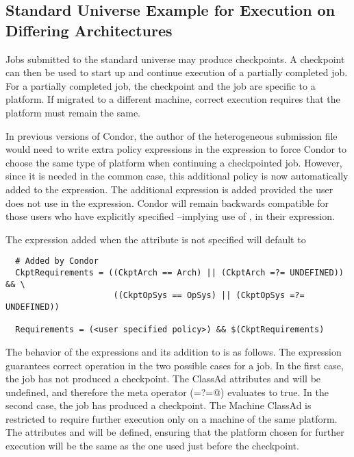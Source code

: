 \subsection{Standard Universe Example for Execution on Differing Architectures} 

Jobs submitted to the standard universe may produce checkpoints.
A checkpoint can then be used to start up and continue execution
of a partially completed job.
For a partially completed job, the checkpoint and the job are specific
to a platform.
If migrated to a different machine, correct execution requires that
the platform must remain the same.

In previous versions of Condor, the author of the heterogeneous
submission file would need to write extra policy expressions in the
 expression to force Condor to choose the
same type of platform when continuing a checkpointed job.
However, since it is needed in the common case, this
additional policy is now automatically added
to the  expression.
The additional expression is added
provided the user does not use
 in the  expression.
Condor will remain backwards compatible for those users who have explicitly
specified --implying use of ,
in their  expression.

The expression added when the attribute  is not specified 
will default to

\begin{verbatim}
  # Added by Condor
  CkptRequirements = ((CkptArch == Arch) || (CkptArch =?= UNDEFINED)) && \
                      ((CkptOpSys == OpSys) || (CkptOpSys =?= UNDEFINED))

  Requirements = (<user specified policy>) && $(CkptRequirements)
\end{verbatim}

The behavior of the  expressions and its addition to
\AdAttr{requirements} is as follows.
The  expression guarantees correct operation
in the two possible cases for a job.
In the first case, the job has not produced a checkpoint.
The ClassAd attributes  and 
will be undefined, and therefore the meta operator (\verb@=?=@)
evaluates to true.
In the second case, the job has produced a checkpoint.
The Machine ClassAd is restricted to require further execution
only on a machine of the same platform.
The attributes  and 
will be defined, ensuring that the platform chosen for further
execution will be the same as the one used just before the
checkpoint.

